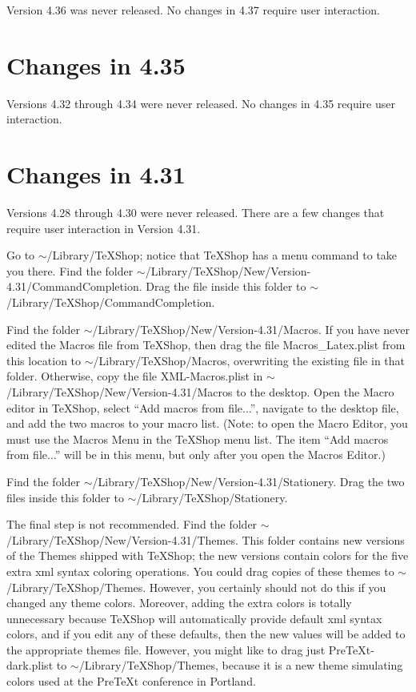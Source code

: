 \documentclass[11pt, oneside]{amsart}
\begin{document}
Version 4.36 was never released. No changes in 4.37 require user interaction.


\section{Changes in 4.35}

Versions 4.32 through 4.34 were never released. No changes in 4.35 require user interaction.

\section{Changes in 4.31}

Versions 4.28 through 4.30 were never released. There are a few changes that require user interaction in Version 4.31. 

Go to
$\sim$/Library/TeXShop; notice that TeXShop has a menu command to take you there. Find the folder
$\sim$/Library/TeXShop/New/Version-4.31/CommandCompletion. Drag the file inside this folder to $\sim$/Library/TeXShop/CommandCompletion.

Find the folder $\sim$/Library/TeXShop/New/Version-4.31/Macros. If you have never edited the Macros file from TeXShop, then drag the file Macros\_Latex.plist from this location to $\sim$/Library/TeXShop/Macros, overwriting the existing file in that folder. Otherwise, copy the file XML-Macros.plist in $\sim$/Library/TeXShop/New/Version-4.31/Macros to the desktop. Open the Macro editor in TeXShop, select ``Add macros from file...'', navigate to the desktop file, and add the two macros to your macro list. (Note: to open the Macro Editor, you must use the Macros Menu in the TeXShop menu list. The item ``Add macros from file...'' will be in this menu, but only after you open the Macros Editor.)

Find the folder $\sim$/Library/TeXShop/New/Version-4.31/Stationery. Drag the two files inside this folder to $\sim$/Library/TeXShop/Stationery.

The final step is not recommended. Find the folder $\sim$/Library/TeXShop/New/Version-4.31/Themes.
This folder contains new versions of the Themes shipped with TeXShop; the new versions contain colors for the five extra xml syntax coloring operations. You could drag copies of these themes to $\sim$/Library/TeXShop/Themes. However, you certainly should not do this if you changed any theme colors. Moreover, adding the extra colors is totally unnecessary because TeXShop will automatically provide default xml syntax colors, and if you edit any of these defaults, then the new values will be added to the appropriate themes file. However, you might like to drag just PreTeXt-dark.plist to $\sim$/Library/TeXShop/Themes, because it is a new theme simulating colors used at the PreTeXt conference in Portland.
\end{document}
